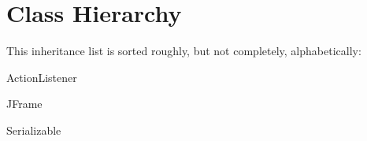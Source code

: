 \section{Class Hierarchy}
This inheritance list is sorted roughly, but not completely, alphabetically\+:\begin{DoxyCompactList}
\item Action\+Listener\begin{DoxyCompactList}
\item {}
\end{DoxyCompactList}
\item J\+Frame\begin{DoxyCompactList}
\item {}
\end{DoxyCompactList}
\item Serializable\begin{DoxyCompactList}
\item {}
\begin{DoxyCompactList}
\item {}
\item {}
\item {}
\end{DoxyCompactList}
\end{DoxyCompactList}
\end{DoxyCompactList}
